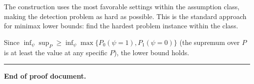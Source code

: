 \documentclass[
  12pt,
]{article}
\begin{document}
The construction uses the most favorable settings within the assumption
class, making the detection problem as hard as possible. This is the
standard approach for minimax lower bounds: find the hardest problem
instance within the class.

Since
\(\inf_\psi \sup_P \geq \inf_\psi \max\{P_0(\psi=1), P_1(\psi=0)\}\)
(the supremum over \(P\) is at least the value at any specific \(P\)),
the lower bound holds.

\begin{center}\rule{0.5\linewidth}{0.5pt}\end{center}

\textbf{End of proof document.}
\end{document}
